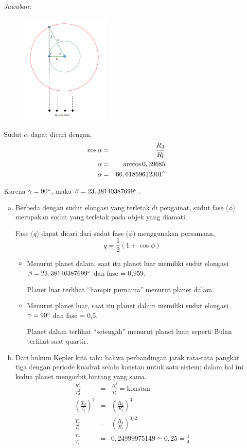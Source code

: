 \documentclass[11pt,fleqn]{exam}
\begin{document}
\begin{questions}
\textit{Jawaban: } 

\begin{figure}[ht!]
\centering
\includegraphics[width=0.4\textwidth]{23.png}
\end{figure}

Sudut $\alpha$ dapat dicari dengan,
\begin{eqnarray*}
\cos{\alpha} &=& \frac{R_{d}}{R_{l}}\\
\alpha &=& \arccos{0,39685}\\
\alpha &=& 66,61859612301\degree
\end{eqnarray*}

Karena $\gamma = 90\degree$, maka $\beta = 23,38140387699\degree$.

\begin{enumerate}[a)]
\item Berbeda dengan sudut elongasi yang terletak di pengamat, sudut fase ($\phi$) merupakan sudut yang terletak pada objek yang diamati. 

Fase ($q$) dapat dicari dari sudut fase ($\phi$) menggunakan persamaan,
$$q = \frac{1}{2} ( 1 + \cos{\phi})$$

\begin{itemize}
\item Menurut planet dalam, saat itu planet luar memiliki sudut elongasi $\beta = 23,38140387699\degree$ dan fase = 0,959. 

Planet luar terlihat ``hampir purnama'' menurut planet dalam.

\item Menurut planet luar, saat itu planet dalam memiliki sudut elongasi $\gamma = 90\degree$ dan fase = 0,5. 

Planet dalam terlihat ``setengah'' menurut planet luar; seperti Bulan terlihat saat quartir.
\end{itemize}

\item Dari hukum Kepler kita tahu bahwa perbandingan jarak rata-rata pangkat tiga dengan periode kuadrat selalu konstan untuk satu sistem; dalam hal ini kedua planet mengorbit bintang yang sama.
\begin{eqnarray*}
\frac{R_d^3}{T_d^2} &=& \frac{R_l^3}{T_l^2} = \text{konstan} \\
\left(\frac{T_d}{T_l}\right)^2 &=& \left(\frac{R_d}{R_l}\right)^3 \\
\frac{T_d}{T_l} &=& \left(\frac{R_d}{R_l}\right)^{3/2} \\
\frac{T_d}{T_l} &=& 0,24999975149 \simeq 0,25 = \frac{1}{4}
\end{eqnarray*}


\end{enumerate}
\end{questions}
\end{document}
